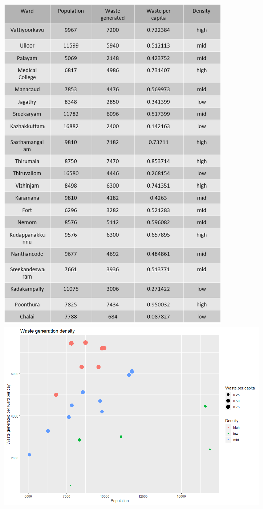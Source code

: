 \documentclass[12pt,a4paper]{report}
\begin{document}
\begin{justify}
	\centering
	\includegraphics[width=0.85\textwidth]{table_waste_dens}
	\vspace{1cm}
	\hspace{5mm}
	\includegraphics[width=1\textwidth]{wgd}
	
\end{justify}
\end{document}
